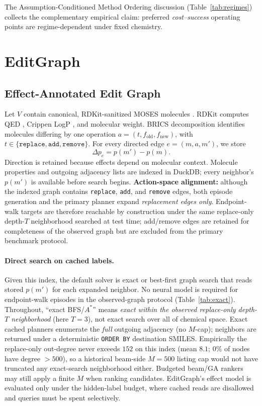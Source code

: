 The Assumption-Conditioned Method Ordering discussion (Table~\ref{tab:regimes}) collects the complementary empirical claim: preferred \emph{cost--success} operating points are regime-dependent under fixed chemistry.

\section{EditGraph}
\label{sec:method}

\subsection{Effect-Annotated Edit Graph}

Let $V$ contain canonical, RDKit-sanitized MOSES molecules \citep{polykovskiy2020moses}. RDKit computes QED \citep{bickerton2012qed}, Crippen LogP \citep{wildman1999crippen}, and molecular weight. BRICS decomposition \citep{degen2008brics} identifies molecules differing by one operation
$a=(t,f_{\mathrm{old}},f_{\mathrm{new}})$, with
$t\in\{\texttt{replace},\texttt{add},\texttt{remove}\}$.
For every directed edge $e=(m,a,m')$, we store
\[
\Delta p_e=p(m')-p(m).
\]
Direction is retained because effects depend on molecular context. Molecule properties and outgoing adjacency lists are indexed in DuckDB; every neighbor's $p(m')$ is available before search begins. \textbf{Action-space alignment:} although the indexed graph contains \texttt{replace}, \texttt{add}, and \texttt{remove} edges, both episode generation and the primary planner expand \emph{replacement edges only}. Endpoint-walk targets are therefore reachable by construction under the same replace-only depth-$T$ neighborhood searched at test time; add/remove edges are retained for completeness of the observed graph but are excluded from the primary benchmark protocol.

\paragraph{Direct search on cached labels.}
Given this index, the default solver is exact or best-first graph search that reads stored $p(m')$ for each expanded neighbor. No neural model is required for endpoint-walk episodes in the observed-graph protocol (Table~\ref{tab:exact}). Throughout, ``exact BFS/$A^\ast$'' means \emph{exact within the observed replace-only depth-$T$ neighborhood} (here $T{=}3$), not exact search over all of chemical space. Exact cached planners enumerate the \emph{full} outgoing adjacency (no $M$-cap); neighbors are returned under a deterministic \texttt{ORDER BY} destination SMILES. Empirically the replace-only out-degree never exceeds $152$ on this index (mean $8.1$; $0\%$ of nodes have degree ${>}500$), so a historical beam-side $M{=}500$ listing cap would not have truncated any exact-search neighborhood either. Budgeted beam/GA rankers may still apply a finite $M$ when ranking candidates. EditGraph's effect model is evaluated only under the hidden-label budget, where cached reads are disallowed and queries must be spent selectively.


